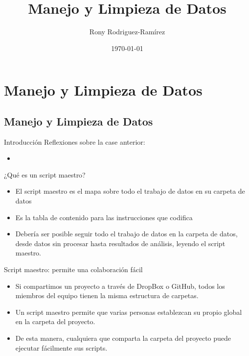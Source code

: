 \documentclass[11pt, aspectratio=169, compress]{beamer}
\title{Manejo y Limpieza de Datos}
\author{Rony Rodriguez-Ramírez}
\institute{LAMBDA}
\date{\today}
\begin{document}
	
\begin{frame}[plain]
	\maketitle 
\end{frame}

\section{Manejo y Limpieza de Datos}
\subsection{Manejo y Limpieza de Datos}
\begin{frame}{Introducción}
	Reflexiones sobre la case anterior: 
	\begin{itemize}
		\item 
	\end{itemize}
\end{frame}
\begin{frame}{¿Qué es un script maestro?}
	\begin{itemize}
		\item El script maestro es el mapa sobre todo el trabajo de datos en su carpeta de datos
		\item Es la tabla de contenido para las instrucciones que codifica
		\item Debería ser posible seguir todo el trabajo de datos en la carpeta de datos, desde datos sin procesar hasta resultados de análisis, leyendo el script maestro. 
	\end{itemize}
\end{frame}
\begin{frame}{Script maestro: permite una colaboración fácil}
	\begin{itemize}
		\item Si compartimos un proyecto a través de DropBox o GitHub, todos los miembros del equipo tienen la misma estructura de carpetas.
		\item Un script maestro permite que varias personas establezcan su propio global en la carpeta del proyecto.
		\item De esta manera, cualquiera que comparta la carpeta del proyecto puede ejecutar fácilmente sus scripts.
	\end{itemize}
\end{frame}
\end{document}
